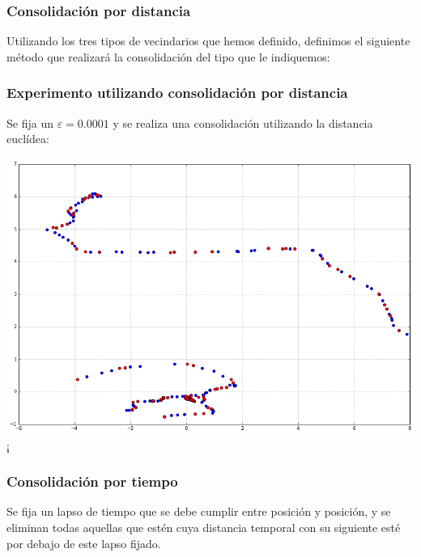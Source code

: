 \documentclass[10pt, spanish]{beamer}
\begin{document}
\begin{frame}[fragile]
\frametitle{Consolidaci\'on por distancia}
Utilizando los tres tipos de vecindarios que hemos definido, definimos el
siguiente m\'etodo que realizará la consolidaci\'on del tipo que le indiquemos:\\

\bigskip

\begin{algorithmic}[1]
        \Else
        \EndIf
\EndFor
\EndFunction
\end{algorithmic}
\end{frame}


\begin{frame}[fragile]
\frametitle{Experimento utilizando consolidaci\'on por distancia}
Se fija un $\varepsilon = 0.0001$ y se realiza una consolidaci\'on utilizando la distancia eucl\'idea:\\

\bigskip

\begin{center}
	\includegraphics[scale=.3]{distanceEuEps10-4.png}¡
\end{center}

\end{frame}

\begin{frame}[fragile]
\frametitle{Consolidaci\'on por tiempo}

Se fija un lapso de tiempo que se debe cumplir entre posici\'on y posici\'on, y se eliminan todas aquellas que est\'en cuya distancia temporal con su siguiente est\'e por debajo de este lapso fijado.\\

\bigskip
\begin{algorithmic}[1]
		\EndIf
	\EndFor
\EndFunction
\end{algorithmic}
\end{frame}
\end{document}
